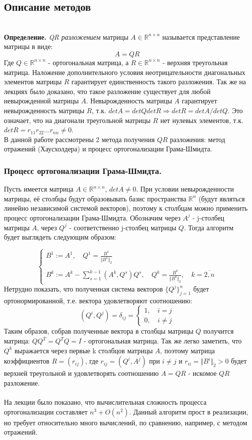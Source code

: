 \documentclass[a4paper,12pt,titlepage,final]{article}
\begin{document}
\subsection{Описание методов}\\
\textbf{Определение.} \textit{QR разложением} матрицы $A \in \mathbb{R}^{n \times n}$ называется представление матрицы в виде: $$A = QR$$
Где $Q \in \mathbb{R}^{n \times n}$ - ортогональная матрица, а $R \in \mathbb{R}^{n \times n}$ - верхняя треугольная матрица. Наложение дополнительного условия неотрицательности диагональных элементов матрицы $R$ гарантирует единственность такого разложения. Так же на лекциях было доказано, что такое разложение существует для любой невырожденной матрицы $A$. Невырожденность матрицы $A$ гарантирует невырожденность матрицы $R$, т.к. $detA = detQ detR \Rightarrow detR = detA / detQ$. Это означает, что на диагонали треугольной матрицы $R$ нет нулевых элементов, т.к. $detR = r_{11}r_{22}\ldots r_{nn} \neq 0$. \\
В данной работе рассмотрены 2 метода получения $QR$ разложения: метод отражений (Хаусхолдера) и процесс ортогонализации Грама-Шмидта.
\subsubsection{Процесс ортогонализации Грама-Шмидта.}
Пусть имеется матрица $A \in \mathbb{R}^{n \times n}$, $detA \neq 0$. При условии невырожденности матрицы, её столбцы будут образовывать базис пространства $\mathbb{R}^n$ (будут являться линейно независимой системой векторов), поэтому к столбцам можно применить процесс ортогонализации Грама-Шмидта. Обозначим через $A^j$ - j-столбец матрицы $A$, через $Q^j$ - соответственно j-столбец матрицы $Q$. Тогда алгоритм будет выглядеть следующим образом:

$$ \begin{cases}
B^1 := A^1, \quad Q^1 = \frac{B^1}{\Vert B^1 \Vert_2} \\ \\
B^k := A^k - \sum_{s = 1}^{k-1} (A^k, Q^s) Q^s, \quad Q^k = \frac{B^k}{\Vert B^k \Vert_2}, \quad k = \overline{2,n}
\end{cases} $$
Нетрудно показать, что полученная система векторов $\{Q^j\}_{j=1}^{n}$ будет ортонормированной, т.е. вектора удовлетворяют соотношению:
$$(Q^i, Q^j) = \delta_{ij} = 
\begin{cases}
    1, \quad i = j \\
    0, \quad i \neq j
\end{cases}
$$
Таким образов, собрав полученные вектора в столбцы матрицы $Q$ получится матрица: $QQ^T = Q^TQ = I$ - ортогональная матрица. Так же легко заметить, что $Q^k$ выражается через первые k столбцов матрицы $A$, поэтому матрица коэффициентов $R = (r_{ij})$, где $r_{ij} = (Q^i, A^j)$ при $i \neq j$ и $r_{ii} = \Vert B^i \Vert_2 > 0$ будет верхней треугольной и удовлетворять соотношению $A = QR$ - искомое $QR$ разложение. \\ \\
На лекции было показано, что вычислительная сложность процесса ортогонализации составляет $n^3 + O(n^2)$. Данный алгоритм прост в реализации, но требует относительно много вычислений, по сравнению, например, с методом отражений.
\end{document}
